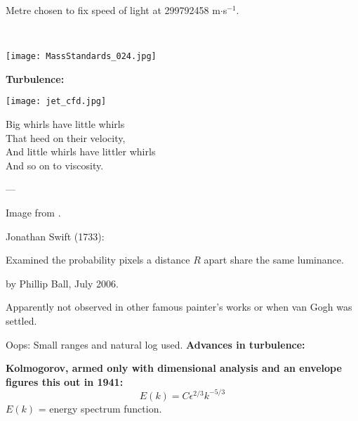 Metre chosen to fix speed of light at 299792458 m$\cdot$s$^{-1}$.        

\\
\medskip
\begin{marginfigure}[]
  \texttt{[image: MassStandards\_024.jpg]}  
\end{marginfigure}



\textbf{Turbulence:}


\begin{marginfigure}[]
  \texttt{[image: jet\_cfd.jpg]}    
\end{marginfigure}


Big whirls have little whirls\\
That heed on their velocity, \\
And little whirls have littler whirls \\
And so on to viscosity.

\hfill---
\small

Image from .

Jonathan Swift (1733): 


Examined the probability pixels a distance $R$ apart share the same luminance.

by Phillip Ball, July 2006.

Apparently not observed in other famous painter's works
or when van Gogh was settled.

Oops: Small ranges and natural log used.
\textbf{Advances in turbulence:}

\textbf{
  Kolmogorov, armed only with dimensional analysis and an envelope
  figures this out in 1941:
}
$$
E(k)
=
C
\epsilon^{2/3}
k^{-5/3}
$$
$E(k)$ = energy spectrum function.

